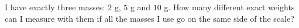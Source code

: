I have exactly three masses: $2$ g, $5$ g and $10$ g. How many different exact weights can I measure with them if all the masses I use go on the same side of the scale?
